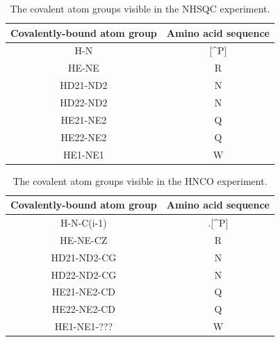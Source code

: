 \begin{table}[h]
  \begin{tabular}{ | c | c | }
    \hline
    Covalently-bound atom group  &  Amino acid sequence  \\  \hline
    H-N                          &  [\^{}P]              \\  \hline
    HE-NE                        &  R                    \\  \hline
    HD21-ND2                     &  N                    \\  \hline
    HD22-ND2                     &  N                    \\  \hline
    HE21-NE2                     &  Q                    \\  \hline
    HE22-NE2                     &  Q                    \\  \hline
    HE1-NE1                      &  W                    \\  \hline
  \end{tabular}
  \caption{The covalent atom groups visible in the NHSQC experiment.}
  \label{nhsqc_peaktypes}
\end{table}

\begin{table}
  \begin{tabular}{ | c | c | }
    \hline
    Covalently-bound atom group  &  Amino acid sequence  \\  \hline
    H-N-C(i-1)                   &  .[\^{}P]             \\  \hline
    HE-NE-CZ                     &  R                    \\  \hline
    HD21-ND2-CG                  &  N                    \\  \hline
    HD22-ND2-CG                  &  N                    \\  \hline
    HE21-NE2-CD                  &  Q                    \\  \hline
    HE22-NE2-CD                  &  Q                    \\  \hline
    HE1-NE1-???                  &  W                    \\  \hline  %
  \end{tabular}
  \caption{The covalent atom groups visible in the HNCO experiment.}
  \label{hnco_peaktypes}
\end{table}
    
